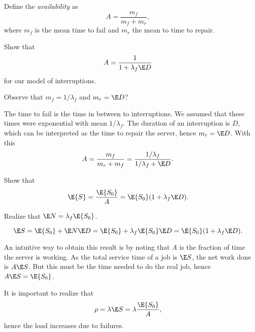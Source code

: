 Define the \emph{availability} as
\begin{equation*}
  A=\frac{m_f}{m_f + m_r},
\end{equation*}
where $m_f$ is the mean time to fail  and $m_r$ the mean to time to repair. 
\begin{exercise}
  Show that 
  \begin{equation*}
A=\frac 1{1+\lambda_f \E D}
  \end{equation*}
for our model of interruptions.
  \begin{hint}
    Observe that $m_f = 1/\lambda_f$ and $m_r = \E D$?
  \end{hint}
  \begin{solution}
The time to fail is the time in between to interruptions. We assumed that these times were exponential with mean $1/\lambda_f$. The duration of an interruption is $D$, which can be interpreted as the time to repair the server, hence $m_r = \E D$. With this
\begin{equation*}
  A=\frac{m_f}{m_r + m_f}=\frac{1/\lambda_f }{1/\lambda_f + \E D}. 
\end{equation*}
  \end{solution}
\end{exercise}


\begin{exercise}
  Show that 
  \begin{equation*}
\E{S} = \frac{\E{S_0}} A = \E{S_0} (1+\lambda_f \E D).
  \end{equation*}
  \begin{hint}
    Realize that $\E N = \lambda_f \E{S_0}$.
  \end{hint}
  \begin{solution}
    \begin{equation*}
      \E S = \E{S_0} + \E N \E D = \E{S_0} +  \lambda_f \E{S_0} \E D= \E{S_0}(1+\lambda_f \E D).
    \end{equation*}
  \end{solution}
\end{exercise}
An intuitive way to obtain this result is by noting that $A$ is the fraction of time the server is working. As the total service time of a job is $\E S$, the net work done is $ A\E S$. But this must be the time needed to do the real job, hence $A \E S = \E{S_0}$.  

It is important to realize that 
\begin{equation*}
\rho = \lambda \E S = \lambda \frac{\E{S_0}}A,
\end{equation*}
hence the load increases due to failures. 


